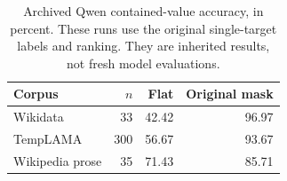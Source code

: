 \begin{table}[t]
\centering
\small
\begin{tabular}{lrrr}
\toprule
Corpus & $n$ & Flat & Original mask \\
\midrule
Wikidata & 33 & 42.42 & 96.97 \\
TempLAMA & 300 & 56.67 & 93.67 \\
Wikipedia prose & 35 & 71.43 & 85.71 \\
\bottomrule
\end{tabular}
\caption{Archived Qwen contained-value accuracy, in percent. These runs use the original single-target labels and ranking. They are inherited results, not fresh model evaluations.}
\label{tab:legacy-reader}
\end{table}
